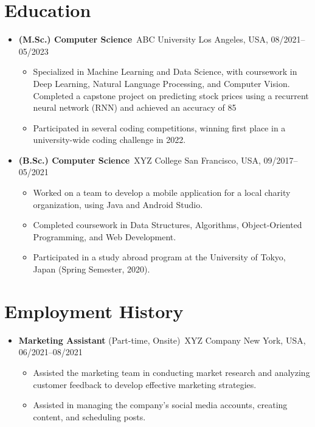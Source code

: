 \documentclass[a4paper,10pt]{article} %
\begin{document}
\section*{Education}

\begin{itemize}[leftmargin=*]
    \item \textbf{(M.Sc.) Computer Science}\
          ABC University \hfill Los Angeles, USA, 08/2021–05/2023
          \begin{itemize}
              \item[\textbullet] Specialized in Machine Learning and Data Science, with coursework in Deep Learning, Natural Language Processing, and Computer Vision. Completed a capstone project on predicting stock prices using a recurrent neural network (RNN) and achieved an accuracy of 85%
              \item[\textbullet] Participated in several coding competitions, winning first place in a university-wide coding challenge in 2022.
          \end{itemize}
    \item \textbf{(B.Sc.) Computer Science}\
          XYZ College \hfill San Francisco, USA, 09/2017–05/2021
          \begin{itemize}
              \item[\textbullet] Worked on a team to develop a mobile application for a local charity organization, using Java and Android Studio.
              \item[\textbullet] Completed coursework in Data Structures, Algorithms, Object-Oriented Programming, and Web Development.
              \item[\textbullet] Participated in a study abroad program at the University of Tokyo, Japan (Spring Semester, 2020).
          \end{itemize}
\end{itemize}

\section*{Employment History}

\begin{itemize}[leftmargin=*]
    \item \textbf{Marketing Assistant} (Part-time, Onsite)\ XYZ Company \hfill New York, USA, 06/2021–08/2021
          \begin{itemize}
              \item[\textbullet] Assisted the marketing team in conducting market research and analyzing customer feedback to develop effective marketing strategies.
              \item[\textbullet] Assisted in managing the company's social media accounts, creating content, and scheduling posts.
          \end{itemize}
\end{itemize}
\end{document}
